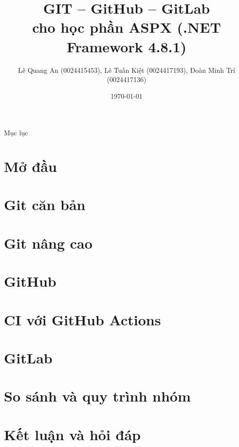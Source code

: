 \documentclass[10pt,aspectratio=169]{beamer}
\title[GIT -- GitHub -- GitLab]{GIT -- GitHub -- GitLab \\ cho học phần ASPX (.NET Framework 4.8.1)}
\author{Lê Quang An (0024415453), Lê Tuấn Kiệt (0024417193), Đoàn Minh Trí (0024417136)}
\institute{Học phần ASPX -- Nhóm 3 thành viên}
\date{\today}
\begin{document}
\frame{\titlepage}

\begin{frame}{Mục lục}
\tableofcontents
\end{frame}

\section{Mở đầu}


\section{Git căn bản}


\section{Git nâng cao}


\section{GitHub}


\section{CI với GitHub Actions}


\section{GitLab}


\section{So sánh và quy trình nhóm}


\section{Kết luận và hỏi đáp}

\end{document}
